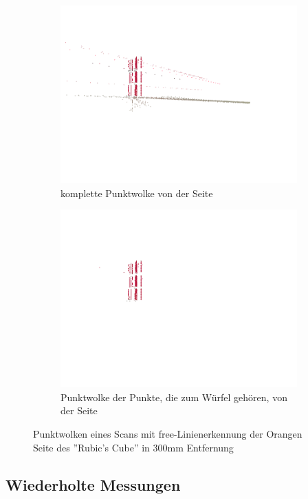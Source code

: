 \documentclass[ngerman,a4paper,parskip=half]{scrartcl}
\begin{document}
\begin{figure}[H]
\begin{subfigure}{0.45\textwidth}
		\includegraphics[width=\textwidth]{includes/free_red_pos1.png}
		\caption{komplette Punktwolke von der Seite}
	\end{subfigure}
	\hfill
	\begin{subfigure}{0.45\textwidth}
		\includegraphics[width=\textwidth]{includes/free_only_red_pos1.png}
		\caption{Punktwolke der Punkte, die zum Würfel gehören, von der Seite}
	\end{subfigure}
	\caption{Punktwolken eines Scans mit free-Linienerkennung der Orangen Seite des ''Rubic's Cube'' in 300mm Entfernung}
\end{figure}


\subsection{Wiederholte Messungen}
\label{sec:reps}
\end{document}
